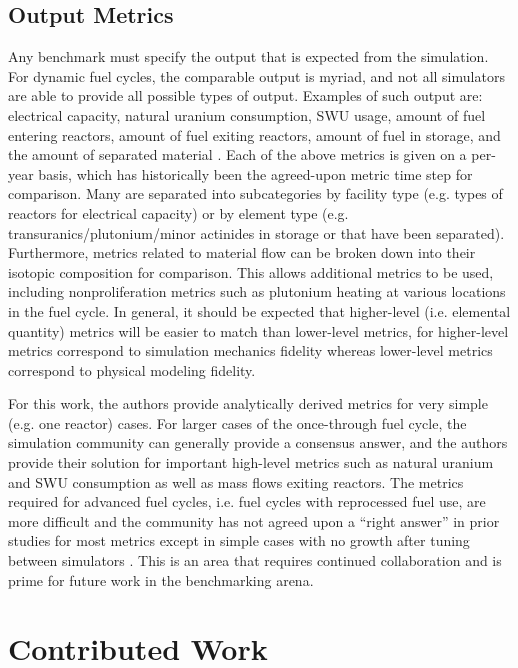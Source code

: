 \documentclass{anstrans}
\begin{document}
\subsection{Output Metrics}
Any benchmark must specify the output that is expected from the simulation. For
dynamic fuel cycles, the comparable output is myriad, and not all simulators are
able to provide all possible types of output. Examples of such output are:
electrical capacity, natural uranium consumption, SWU usage, amount of fuel
entering reactors, amount of fuel exiting reactors, amount of fuel in storage,
and the amount of separated material
\cite{boucher_specification_2008}\cite{guerin_benchmark_2009}. Each of the above
metrics is given on a per-year basis, which has historically been the
agreed-upon metric time step for comparison. Many are separated into
subcategories by facility type (e.g. types of reactors for electrical capacity)
or by element type (e.g. transuranics/plutonium/minor actinides in storage or
that have been separated). Furthermore, metrics related to material flow can be
broken down into their isotopic composition for comparison. This allows
additional metrics to be used, including nonproliferation metrics such as
plutonium heating at various locations in the fuel cycle. In general, it should
be expected that higher-level (i.e. elemental quantity) metrics will be easier
to match than lower-level metrics, for higher-level metrics correspond to
simulation mechanics fidelity whereas lower-level metrics correspond to physical
modeling fidelity.

For this work, the authors provide analytically derived metrics for very simple
(e.g. one reactor) cases. For larger cases of the once-through fuel cycle, the
simulation community can generally provide a consensus answer, and the authors
provide their solution for important high-level metrics such as natural uranium
and SWU consumption as well as mass flows exiting reactors. The metrics required
for advanced fuel cycles, i.e. fuel cycles with reprocessed fuel use, are more
difficult and the community has not agreed upon a ``right answer'' in prior
studies for most metrics except in simple cases with no growth after tuning
between simulators \cite{guerin_benchmark_2009}. This is an area that requires
continued collaboration and is prime for future work in the benchmarking arena.

\section{Contributed Work}
\end{document}
